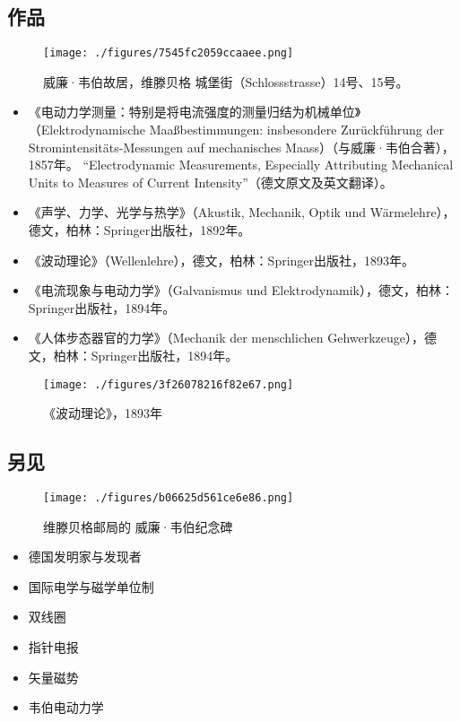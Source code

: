 \subsection{作品}
\begin{figure}[ht]
\centering
\texttt{[image: ./figures/7545fc2059ccaaee.png]}
\caption{威廉·韦伯故居，维滕贝格 城堡街（Schlossstrasse）14号、15号。} \label{fig_Eduard_2}
\end{figure}
\begin{itemize}
\item 《电动力学测量：特别是将电流强度的测量归结为机械单位》（Elektrodynamische Maaßbestimmungen: insbesondere Zurückführung der Stromintensitäts-Messungen auf mechanisches Maass）（与威廉·韦伯合著），1857年。  
   “Electrodynamic Measurements, Especially Attributing Mechanical Units to Measures of Current Intensity”（德文原文及英文翻译）。
\item 《声学、力学、光学与热学》（Akustik, Mechanik, Optik und Wärmelehre），德文，柏林：Springer出版社，1892年。
\item 《波动理论》（Wellenlehre），德文，柏林：Springer出版社，1893年。
\item 《电流现象与电动力学》（Galvanismus und Elektrodynamik），德文，柏林：Springer出版社，1894年。
\item 《人体步态器官的力学》（Mechanik der menschlichen Gehwerkzeuge），德文，柏林：Springer出版社，1894年。
\end{itemize}
\begin{figure}[ht]
\centering
\texttt{[image: ./figures/3f26078216f82e67.png]}
\caption{《波动理论》，1893年} \label{fig_Eduard_3}
\end{figure}
\subsection{另见}  
\begin{figure}[ht]
\centering
\texttt{[image: ./figures/b06625d561ce6e86.png]}
\caption{维滕贝格邮局的 威廉·韦伯纪念碑} \label{fig_Eduard_4}
\end{figure}
\begin{itemize}
\item 德国发明家与发现者  
\item 国际电学与磁学单位制  
\item 双线圈  
\item 指针电报  
\item 矢量磁势  
\item 韦伯电动力学
\end{itemize}